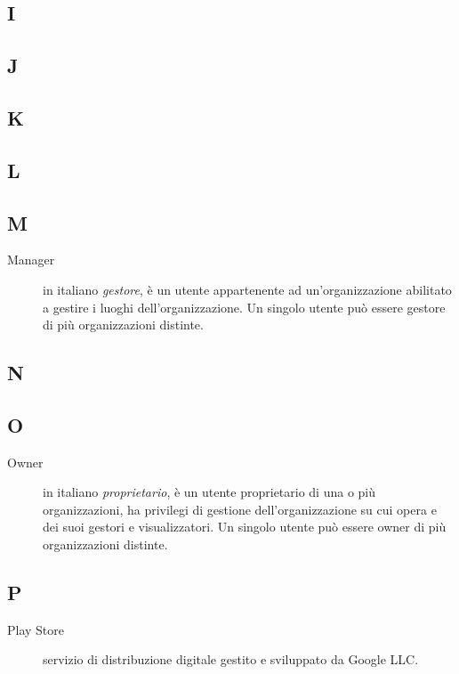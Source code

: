\documentclass[../../../analisi-dei-requisiti.tex]{subfiles}
\begin{document}
\subsection{I}

\subsection{J}

\subsection{K}

\subsection{L}

\subsection{M}
\begin{description}
    \item[Manager] in italiano \textit{gestore}, è un utente appartenente ad un'organizzazione abilitato a gestire i luoghi dell'organizzazione. Un singolo utente può essere gestore di più organizzazioni distinte.
\end{description}

\subsection{N}

\subsection{O}
\begin{description}
    \item[Owner] in italiano \textit{proprietario}, è un utente proprietario di una o più organizzazioni, ha privilegi di gestione dell'organizzazione su cui opera e dei suoi gestori e visualizzatori. Un singolo utente può essere owner di più organizzazioni distinte.
\end{description}

\subsection{P}
\begin{description}
    \item[Play Store] servizio di distribuzione digitale gestito e sviluppato da Google LLC.
\end{description}
\end{document}
